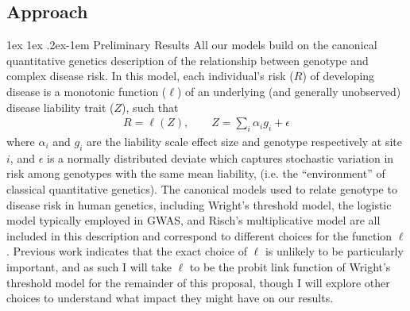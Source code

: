 \documentclass[11pt]{article}
\makeatletter
\renewcommand{\paragraph}{%
  \@startsection{paragraph}{4}%
  {\z@}{1ex \@plus 1ex \@minus .2ex}{-1em}%
  {\normalfont\normalsize\bfseries}%
}
\makeatother
\begin{document}


\setlength{\abovedisplayskip}{3.5pt}
\setlength{\belowdisplayskip}{3.5pt}

\subsection*{Approach}
\paragraph{Preliminary Results}
All our models build on the canonical quantitative genetics description of the relationship between genotype and complex disease risk. In this model, each individual's risk ($R$) of developing disease is a monotonic function ($\ell$) of an underlying (and generally unobserved) disease liability trait ($Z$), such that
\begin{align}
  R=\ell(Z),    \qquad    Z = \sum_{i}\alpha_ig_i + \epsilon
\end{align}
where $\alpha_i$ and $g_i$ are the liability scale effect size and genotype respectively at site $i$, and $\epsilon$ is a normally distributed deviate which captures stochastic variation in risk among genotypes with the same mean liability, (i.e. the ``environment'' of classical quantitative genetics). The canonical models used to relate genotype to disease risk in human genetics, including Wright's threshold model\cite{Wright:1934wd,Lush:1948vc,FalconerAndMcKay,Falconer:1965bn}, the logistic model typically employed in GWAS\cite{Risch:1996ub}, and Risch's multiplicative model \cite{Risch:1990ty} are all included in this description and correspond to different choices for the function $\ell$. Previous work \cite{Slatkin:2008hw, Wray:2010ir} indicates that the exact choice of $\ell$ is unlikely to be particularly important, and as such I will take $\ell$ to be the probit link function of Wright's threshold model for the remainder of this proposal, though I will explore other choices to understand what impact they might have on our results.
\end{document}

